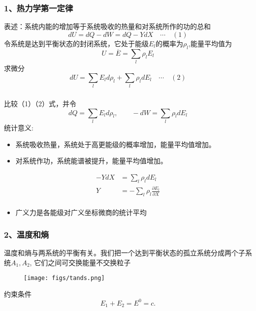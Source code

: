 \begin{frame}
  \frametitle{ 1、热力学第一定律}
  表述：系统内能的增加等于系统吸收的热量和对系统所作的功的总和 
\[ dU = dQ - dW = dQ- Y dX \quad \cdots \quad (1) \]
令系统是达到平衡状态的封闭系统，它处于能级$E_l$的概率为$\rho _l$,能量平均值为
\[ U = \overline{E} = \sum_l \rho _l E_l\]
求微分
\[ dU = \sum_l E_l d\rho _l + \sum_l \rho _l d E_l \quad \cdots \quad (2)\]
\end{frame} 

\begin{frame}
  \frametitle{}
比较（1）（2）式，并令  
\[ dQ = \sum_l E_l d\rho _l, \qquad  -dW = \sum_l \rho _l d E_l \]
统计意义:
\begin{itemize}
  \item 系统吸收热量，系统处于高更能级的概率增加，能量平均值增加。
  \item 对系统作功，系统能谱被提升，能量平均值增加。
\end{itemize}
\[
\begin{aligned}
  -Y dX &= \sum_l \rho _l d E_l  \\
  Y &= - \sum_l \rho _l \frac{\partial E_l }{\partial X}    \\ 
\end{aligned}\]
\begin{itemize}
  \item 广义力是各能级对广义坐标微商的统计平均
\end{itemize}
\end{frame} 

\begin{frame}
  \frametitle{ 2、温度和熵 }
  温度和熵与两系统的平衡有关。我们把一个达到平衡状态的孤立系统分成两个子系统$A_1, A_2$, 它们之间可交换能量不交换粒子
  \begin{figure}[htbp]
    \centering
    \texttt{[image: figs/tands.png]}
  \end{figure}
  约束条件
  \[ E_1 + E_2 = E^0 =c.\]
\end{frame} 

